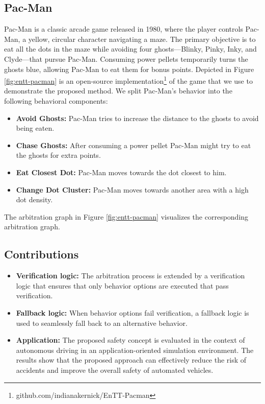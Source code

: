 \subsection{Pac-Man}

Pac-Man is a classic arcade game released in 1980, where the player controls Pac-Man, a yellow, circular character navigating a maze.
The primary objective is to eat all the dots in the maze while avoiding four ghosts—Blinky, Pinky, Inky, and Clyde—that pursue Pac-Man.
Consuming power pellets temporarily turns the ghosts blue, allowing Pac-Man to eat them for bonus points.
Depicted in Figure \ref{fig:entt-pacman} is an open-source implementation\footnote{github.com/indianakernick/EnTT-Pacman} of the game that we use to demonstrate the proposed method.
We split Pac-Man's behavior into the following behavioral components:

\begin{itemize}
    \item \textbf{Avoid Ghosts:} Pac-Man tries to increase the distance to the ghosts to avoid being eaten.
    \item \textbf{Chase Ghosts:} After consuming a power pellet Pac-Man might try to eat the ghosts for extra points.
    \item \textbf{Eat Closest Dot:} Pac-Man moves towards the dot closest to him.
    \item \textbf{Change Dot Cluster:} Pac-Man moves towards another area with a high dot density.
\end{itemize}

The arbitration graph in Figure \ref{fig:entt-pacman} visualizes the corresponding arbitration graph.

\subsection{Contributions}

\begin{itemize}
    \item \textbf{Verification logic:} The arbitration process is extended by a verification logic that ensures that only behavior options are executed that pass verification.
    \item \textbf{Fallback logic:} When behavior options fail verification, a fallback logic is used to seamlessly fall back to an alternative behavior.
    \item \textbf{Application:} The proposed safety concept is evaluated in the context of autonomous driving in an application-oriented simulation environment. The results show that the proposed approach can effectively reduce the risk of accidents and improve the overall safety of automated vehicles.
\end{itemize}
